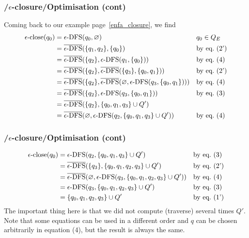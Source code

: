%
\begin{frame}
\frametitle{\eNFA{}/\(\epsilon\)-closure/Optimisation (cont)}

Coming back to our example page~\ref{enfa_closure}, we find
\begin{align*}
   \epsilon\text{-close} (q_0)
&= \epsilon\text{-DFS} (q_0, \varnothing)
&& q_0 \in Q_E\\
&= \overline{\epsilon\text{-DFS}} (\{q_1, q_2\}, \{q_0\})
&& \text{by eq.~(2')}\\
&= \overline{\epsilon\text{-DFS}} (\{q_2\}, \epsilon\text{-DFS} (q_1, \{q_0\}))
&& \text{by eq.~(4)}\\
&= \overline{\epsilon\text{-DFS}} (\{q_2\}, \overline{\epsilon\text{-DFS}} (\{q_3\}, \{q_0,
   q_1\}))
&& \text{by eq.~(2')}\\
&= \overline{\epsilon\text{-DFS}} (\{q_2\}, \overline{\epsilon\text{-DFS}} (\varnothing, \epsilon\text{-DFS} (q_3, \{q_0, q_1\})))
&& \text{by eq.~(4)}\\
&= \overline{\epsilon\text{-DFS}} (\{q_2\}, \epsilon\text{-DFS} (q_3, \{q_0, q_1\}))
&& \text{by eq.~(3)}\\
&= \overline{\epsilon\text{-DFS}} (\{q_2\}, \{q_0, q_1, q_3\} \cup Q')\\
&= \overline{\epsilon\text{-DFS}} (\varnothing, \epsilon\text{-DFS} (q_2, \{q_0, q_1, q_3\} \cup Q'))
&& \text{by eq.~(4)}
\end{align*}

\end{frame}

%
\begin{frame}
\frametitle{\eNFA{}/\(\epsilon\)-closure/Optimisation (cont)}

\begin{align*}
   \epsilon\text{-close} (q_0)
&= \epsilon\text{-DFS} (q_2, \{q_0, q_1, q_3\} \cup Q')
&& \text{by eq.~(3)}\\
&= \overline{\epsilon\text{-DFS}} (\{q_3\}, \{q_0, q_1, q_2, q_3\} \cup Q')
&& \text{by eq.~(2')}\\
&= \overline{\epsilon\text{-DFS}} (\varnothing, \epsilon\text{-DFS} (q_3, \{q_0, q_1, q_2, q_3\} \cup Q'))
&& \text{by eq.~(4)}\\
&= \epsilon\text{-DFS} (q_3, \{q_0, q_1, q_2, q_3\} \cup Q')
&& \text{by eq.~(3)}\\
&= \{q_0, q_1, q_2, q_3\} \cup Q'
&& \text{by eq.~(1')}\\
\end{align*}
The important thing here is that we did not compute (traverse) several
times \(Q'\). Note that some equations can be used in a different
order and \(q\) can be chosen arbitrarily in equation (4), but the
result is always the same.

\end{frame}

